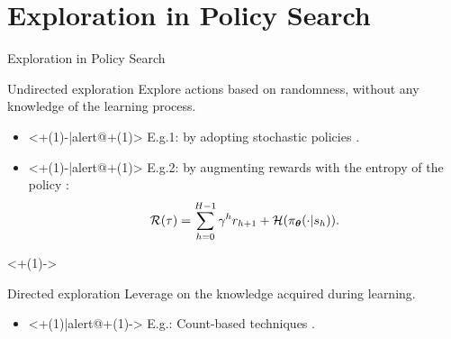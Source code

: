 \section{Exploration in Policy Search}


\begin{frame}{Exploration in Policy Search}
	
	\begin{block}{Undirected exploration}
	Explore actions based on randomness, without any knowledge of the learning process.

	\begin{itemize}[noitemsep,topsep=0pt]
		\item<+(1)-|alert@+(1)> E.g.1: by adopting stochastic policies \cite{deisenroth2013survey}.
		\item<+(1)-|alert@+(1)> E.g.2: by augmenting rewards with the entropy of the policy \cite{haarnoja2018soft}: 
		\begin{equation*}
		\mathcal{R}(\tau) = \sum_{h=0}^{H-1}\gamma^hr_{h+1} + \mathcal{H}(\pi_{\boldsymbol{\theta}}(\cdot|s_h)).
		\end{equation*}
	\end{itemize}
	\end{block}
	
	\onslide<+(1)->{
	\begin{block}{Directed exploration}
	Leverage on the knowledge acquired during learning.
		\begin{itemize}
		\item<+(1)|alert@+(1)-> E.g.: Count-based techniques \cite{bellemare2016unifying}.
		\end{itemize}
	\end{block}
	}
	
\end{frame}

%	
%	

